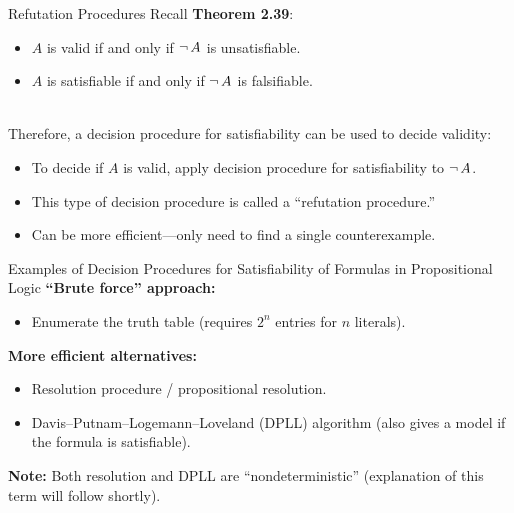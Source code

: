\documentclass[style=sailor,size=12pt]{powerdot}
\begin{document}
\begin{wideslide}[bm=,toc=]{Refutation Procedures}
Recall \textbf{Theorem 2.39}: 
\begin{itemize}
\item $A$ is valid if and only if $\mathop{\neg} A$ is unsatisfiable.
\item $A$ is satisfiable if and only if $\mathop{\neg} A$ is falsifiable.
\end{itemize}

~\\
Therefore, a decision procedure for satisfiability can be used to decide validity: 
\begin{itemize}
\item To decide if $A$ is valid, apply decision procedure for satisfiability to $\mathop{\neg} A$. 
\item This type of decision procedure is called a ``refutation procedure.'' 
\item Can be more efficient---only need to find a single counterexample.
\end{itemize} 
\end{wideslide}

\begin{wideslide}[bm=,toc=]{Examples of Decision Procedures for Satisfiability
  of Formulas in Propositional Logic}
\textbf{``Brute force'' approach:}
\begin{itemize}
\item Enumerate the truth table (requires $2^n$ entries for $n$ literals).
\end{itemize} 
\textbf{More efficient alternatives:}
\begin{itemize}
\item Resolution procedure / propositional resolution.
\item Davis--Putnam--Logemann--Loveland (DPLL) algorithm (also gives a model if
    the formula is satisfiable).
\end{itemize} 
\textbf{Note:} Both resolution and DPLL are ``nondeterministic'' (explanation
    of this term will follow shortly).
\end{wideslide}
\end{document}
